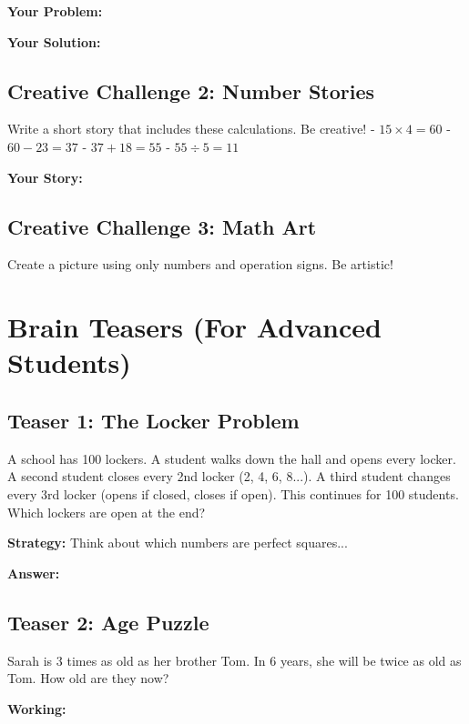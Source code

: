 \documentclass{article}
\begin{document}
\textbf{Your Problem:}
\vspace{3cm}

\textbf{Your Solution:}
\vspace{2cm}

\subsection*{Creative Challenge 2: Number Stories}
Write a short story that includes these calculations. Be creative!
- $15 \times 4 = 60$
- $60 - 23 = 37$  
- $37 + 18 = 55$
- $55 \div 5 = 11$

\textbf{Your Story:}
\vspace{5cm}

\subsection*{Creative Challenge 3: Math Art}
Create a picture using only numbers and operation signs. Be artistic!

\vspace{6cm}

\section{Brain Teasers (For Advanced Students)}

\subsection*{Teaser 1: The Locker Problem}
A school has 100 lockers. A student walks down the hall and opens every locker. A second student closes every 2nd locker (2, 4, 6, 8...). A third student changes every 3rd locker (opens if closed, closes if open). This continues for 100 students. Which lockers are open at the end?

\textbf{Strategy:} Think about which numbers are perfect squares...

\textbf{Answer:} \underline{\hspace{8cm}}

\subsection*{Teaser 2: Age Puzzle}
Sarah is 3 times as old as her brother Tom. In 6 years, she will be twice as old as Tom. How old are they now?

\textbf{Working:}
\vspace{3cm}
\end{document}
